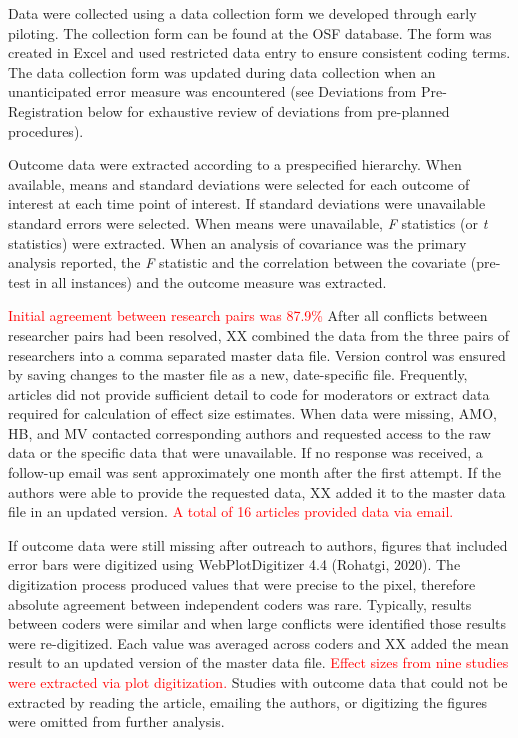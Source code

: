 \documentclass[
  english,
  man, donotrepeattitle,mask,floatsintext]{apa7}
\begin{document}
Data were collected using a data collection form we developed through early piloting. The collection form can be found at the OSF database. The form was created in Excel and used restricted data entry to ensure consistent coding terms. The data collection form was updated during data collection when an unanticipated error measure was encountered (see Deviations from Pre-Registration below for exhaustive review of deviations from pre-planned procedures).

Outcome data were extracted according to a prespecified hierarchy. When available, means and standard deviations were selected for each outcome of interest at each time point of interest. If standard deviations were unavailable standard errors were selected. When means were unavailable, \emph{F} statistics (or \emph{t} statistics) were extracted. When an analysis of covariance was the primary analysis reported, the \emph{F} statistic and the correlation between the covariate (pre-test in all instances) and the outcome measure was extracted.

\textcolor{red}{Initial agreement between research pairs was 87.9\%} After all conflicts between researcher pairs had been resolved, XX combined the data from the three pairs of researchers into a comma separated master data file. Version control was ensured by saving changes to the master file as a new, date-specific file. Frequently, articles did not provide sufficient detail to code for moderators or extract data required for calculation of effect size estimates. When data were missing, AMO, HB, and MV contacted corresponding authors and requested access to the raw data or the specific data that were unavailable. If no response was received, a follow-up email was sent approximately one month after the first attempt. If the authors were able to provide the requested data, XX added it to the master data file in an updated version. \textcolor{red}{A total of 16 articles provided data via email.}

If outcome data were still missing after outreach to authors, figures that included error bars were digitized using WebPlotDigitizer 4.4 (Rohatgi, 2020). The digitization process produced values that were precise to the pixel, therefore absolute agreement between independent coders was rare. Typically, results between coders were similar and when large conflicts were identified those results were re-digitized. Each value was averaged across coders and XX added the mean result to an updated version of the master data file. \textcolor{red}{Effect sizes from nine studies were extracted via plot digitization.} Studies with outcome data that could not be extracted by reading the article, emailing the authors, or digitizing the figures were omitted from further analysis.
\end{document}
